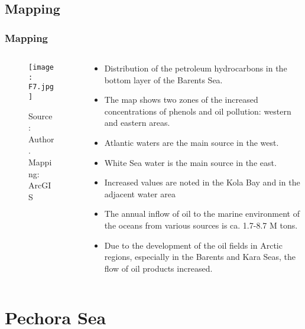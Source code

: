\documentclass[pdflatex,compress,8pt,
	xcolor={dvipsnames,dvipsnames,svgnames,x11names,table},
	hyperref={	
	breaklinks = true, 
	pdfauthor={Lemenkova Polina}, 
	pdfsubject={Presentation}, 
	pdfcreator={Lemenkova Polina}, 
	pdfproducer={Lemenkova Polina}, 
	colorlinks=true,
	linkcolor=NavyBlue, 
	citecolor=NavyBlue, 
	urlcolor = NavyBlue, 
	breaklinks = true}]{beamer}
\begin{document}
\subsection{Mapping}
\begin{frame}\frametitle{Mapping}
\begin{minipage}[0.4\textheight]{\textwidth}
\begin{columns}[T]
\begin{column}{0.5\textwidth}
\begin{figure}[H]
	\centering
		\texttt{[image: F7.jpg]}\caption{Source: Author. Mapping: ArcGIS}
\end{figure}
\end{column}
\begin{column}{0.5\textwidth}
\vspace{2em} 
\begin{itemize}
	\item Distribution of the petroleum hydrocarbons in the bottom layer of the Barents Sea. 
	\item The map shows two zones of the increased concentrations of phenols and oil pollution: western and eastern areas. 
	\item Atlantic waters are the main source in the west. 
	\item White Sea water is the main source in the east. 
	\item Increased values are noted in the Kola Bay and in the adjacent water area
	\item The annual inflow of oil to the marine environment of the oceans from various sources is ca. 1.7-8.7 M tons.
	\item Due to the development of the oil fields in Arctic regions, especially in the Barents and Kara Seas, the flow of oil products increased.
\end{itemize}
\end{column}
\end{columns}
\end{minipage}
\end{frame}

\section{Pechora Sea}
\end{document}
